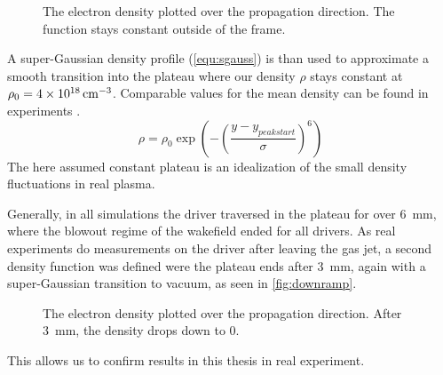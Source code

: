 \documentclass[bachelor_thesis]{subfiles}
\begin{document}
\begin{figure}
	\centering
	
	\caption{The electron density plotted over the propagation direction. The function stays constant outside of the frame.}
	\label{fig:dens}
\end{figure}

A super-Gaussian density profile (\autoref{equ:sgauss}) is than used to approximate a smooth transition into the plateau where our density $\rho$ stays constant at $\rho_0 = \qty{4d18}{\cm^{-3}}$. Comparable values for the mean density can be found in experiments \cite{Schoebel2022, Kurz2021}.
\begin{equation}
	\rho = \rho_0 \exp\left(-\left(\frac{y-y_{peak start}}{\sigma}\right)^6\right)
	\label{equ:sgauss}
\end{equation}
The here assumed constant plateau is an idealization of the small density fluctuations in real plasma.

Generally, in all simulations the driver traversed in the plateau for over \qty{6}{\mm}, where the blowout regime of the wakefield ended for all drivers. As real experiments do measurements on the driver after leaving the gas jet,
a second density function was defined were the plateau ends after \qty{3}{\mm}, again with a super-Gaussian transition to vacuum, as seen in \autoref{fig:downramp}.
\begin{figure}
	\centering
	\missingfigure{}
	\caption{The electron density plotted over the propagation direction. After \qty{3}{\mm}, the density drops down to 0.}
	\label{fig:downramp}
\end{figure}
This allows us to confirm results in this thesis in real experiment.
\end{document}
